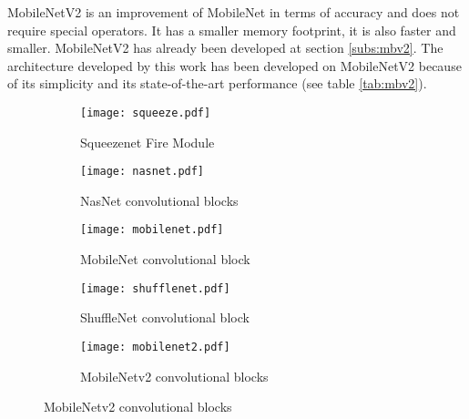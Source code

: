 MobileNetV2 \cite{sandler_mobilenetv2_2019} is an improvement of MobileNet in terms of accuracy and does not require special operators. It has a smaller memory footprint, it is also faster and smaller. MobileNetV2 has already been developed at section \ref{subs:mbv2}. The architecture developed by this work has been developed on MobileNetV2 because of its simplicity and its state-of-the-art performance (see table \ref{tab:mbv2}).
%
\begin{figure}
    \centering
    \begin{subfigure}{.2\textwidth}
        \centering
        \texttt{[image: squeeze.pdf]}
        \caption{Squeezenet Fire Module\cite{iandola_squeezenet_2016}}
        \label{fig:archi_building_block:sqn}
    \end{subfigure}
    \begin{subfigure}{.33\textwidth}
        \centering
        \texttt{[image: nasnet.pdf]}
        \caption{NasNet convolutional blocks \cite{zoph_learning_2018}}
        \label{fig:archi_building_block:nasn}
    \end{subfigure}
    \begin{subfigure}{.33\textwidth}
        \centering
        \texttt{[image: mobilenet.pdf]}
        \caption{MobileNet convolutional block \cite{howard_mobilenets_2017}}
        \label{fig:archi_building_block:mbn}
    \end{subfigure}
    \begin{subfigure}{.33\textwidth}
        \centering
        \texttt{[image: shufflenet.pdf]}
        \caption{ShuffleNet convolutional block \cite{zhang_shufflenet_2018}}
        \label{fig:archi_building_block:shn}
    \end{subfigure}
    \begin{subfigure}{.33\textwidth}
        \centering
        \texttt{[image: mobilenet2.pdf]}
        \caption{MobileNetv2 convolutional blocks \cite{sandler_mobilenetv2_2019}}
        \label{fig:archi_building_block:mb2n}
    \end{subfigure}
    \label{fig:archi_building_block}
\end{figure}

